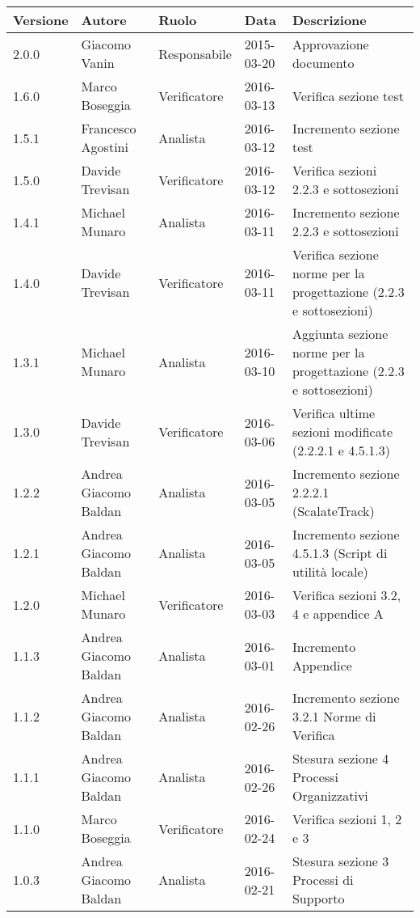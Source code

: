 \documentclass{scalatekids-article}
\begin{document}
\begin{center}
  \begin{longtable}{| l | l | l | l | p{5cm} |}
    \hline
    Versione & Autore & Ruolo & Data & Descrizione \\
    \hline
    2.0.0 & Giacomo Vanin & Responsabile & 2015-03-20 & Approvazione documento\\
    \hline
    1.6.0 & Marco Boseggia & Verificatore & 2016-03-13 & Verifica sezione test\\
    \hline
    1.5.1 & Francesco Agostini & Analista & 2016-03-12 & Incremento sezione test\\
    \hline
    1.5.0 & Davide Trevisan & Verificatore & 2016-03-12 & Verifica sezioni 2.2.3 e sottosezioni\\
    \hline
    1.4.1 & Michael Munaro & Analista & 2016-03-11 & Incremento sezione 2.2.3 e sottosezioni\\
    \hline
    1.4.0 & Davide Trevisan & Verificatore & 2016-03-11 & Verifica sezione norme per la progettazione (2.2.3 e sottosezioni)\\
    \hline
    1.3.1 & Michael Munaro & Analista & 2016-03-10 & Aggiunta sezione norme per la progettazione (2.2.3 e sottosezioni)\\
    \hline
    1.3.0 & Davide Trevisan & Verificatore & 2016-03-06 & Verifica ultime sezioni modificate (2.2.2.1 e 4.5.1.3)\\
    \hline
    1.2.2 & Andrea Giacomo Baldan & Analista & 2016-03-05 & Incremento sezione 2.2.2.1 (ScalateTrack)\\
    \hline
    1.2.1 & Andrea Giacomo Baldan & Analista & 2016-03-05 & Incremento sezione 4.5.1.3 (Script di utilità locale)\\
    \hline
    1.2.0 & Michael Munaro & Verificatore & 2016-03-03 & Verifica sezioni 3.2, 4 e appendice A \\
    \hline
    1.1.3 & Andrea Giacomo Baldan & Analista & 2016-03-01 & Incremento Appendice\\
    \hline
    1.1.2 & Andrea Giacomo Baldan & Analista & 2016-02-26 & Incremento sezione 3.2.1 Norme di Verifica\\
    \hline
    1.1.1 & Andrea Giacomo Baldan & Analista & 2016-02-26 & Stesura sezione 4 Processi Organizzativi\\
    \hline
    1.1.0 & Marco Boseggia & Verificatore & 2016-02-24 & Verifica sezioni 1, 2 e 3\\
    \hline
    1.0.3 & Andrea Giacomo Baldan & Analista & 2016-02-21 & Stesura sezione 3 Processi di Supporto\\

\end{longtable}
\end{center}
\end{document}
